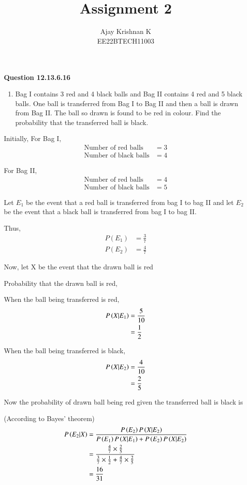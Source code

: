 \documentclass[journal,11pt]{IEEEtran}
\begin{document}
\vspace{3cm}
\author{Ajay Krishnan K\\EE22BTECH11003}

\title{Assignment 2}
\maketitle

\textbf{Question 12.13.6.16}
\begin{enumerate}
\item Bag I contains 3 red and 4 black balls and Bag II contains 4 red and 5 black balls.
One ball is transferred from Bag I to Bag II and then a ball is drawn from Bag II.
The ball so drawn is found to be red in colour. Find the probability that the
transferred ball is black.
\end{enumerate}

\solution

Initially,
For Bag I,
\begin{align}
\text{Number of red balls} &=3 \\
\text{Number of black balls} &= 4
\end{align}

For Bag II,
\begin{align}
\text{Number of red balls} &= 4 \\
\text{Number of black balls} &= 5 
\end{align}

Let $E_1$ be the event that a red ball is transferred from bag I to bag II
and let $E_2$ be the event that a black ball is transferred from bag I to bag II.

Thus,
\begin{align}
P(E_1) &= \frac{3}{7} \\
P(E_2) &= \frac{4}{7}
\end{align}

Now, let X be the event that the drawn ball is red

Probability that the drawn ball is red,

When the ball being transferred is red,
\begin{align}
P\left(X\middle|E_1\right) &= \frac{5}{10}\\
&=\frac{1}{2}
\end{align}

When the ball being transferred is black,
\begin{align}
P\left(X\middle|E_2\right) &= \frac{4}{10}\\
&=\frac{2}{5}
\end{align}

Now the probability of drawn ball being red given the transferred ball 
is black is

(According to Bayes' theorem)
\begin{align}
P\left(E_2\middle|X\right) &= \frac{P\left(E_2\right)P\left(X\middle|E_2\right)}{P\left(E_1\right)P\left(X\middle|E_1\right) + P\left(E_2\right)P\left(X\middle|E_2\right)}\\
&= \frac{\frac{4}{7} \times \frac{2}{5}}{\frac{3}{7}\times\frac{1}{2}+\frac{4}{7}\times\frac{2}{5}}\\
&= \frac{16}{31}
\end{align}
\end{document}
